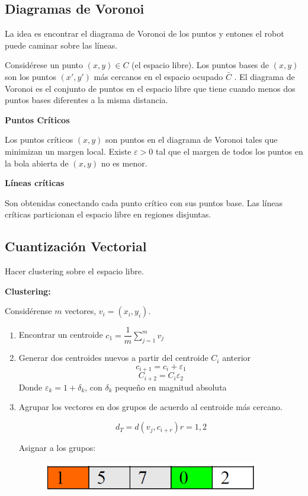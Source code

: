 \subsection{Diagramas de Voronoi}

La idea es encontrar el diagrama de Voronoi de los puntos y entones el robot puede caminar sobre las líneas.

Considérese un punto $(x,y) \in C$ (el espacio libre). Los puntos bases de $(x,y)$ son los puntos $(x',y')$ más
cercanos en el espacio ocupado $\bar{C}$ . El diagrama de Voronoi es el conjunto de puntos en el espacio libre que
tiene cuando menos dos puntos bases diferentes a la misma distancia.


\textbf{Puntos Críticos}

Los puntos críticos $(x,y)$ son puntos en el diagrama de Voronoi tales que minimizan un margen local.
Existe $\varepsilon > 0$  tal que el margen de todos los puntos en la bola abierta de $(x,y)$ no es menor.


\textbf{Líneas críticas}

Son obtenidas conectando cada punto crítico con sus puntos base. Las líneas críticas particionan el espacio
libre en regiones disjuntas.

\subsection{Cuantización Vectorial}

Hacer clustering sobre el espacio libre.

\textbf{Clustering:}

Considérense $m$ vectores, $v_i = (x_i , y_i).$

\begin{enumerate}[1.]
	\item Encontrar un centroide $c_1 = \dfrac{1}{m} \sum_{j=1}^{m} v_j$
	
	\item Generar dos centroides nuevos a partir del centroide $C_i$ anterior
	$$c_{i+1} = c_i + \varepsilon_1$$
	$$C_{i+2} = C_i \varepsilon_2$$
	Donde $\varepsilon_k = 1 + \delta_k$, con $\delta_k$ pequeño en magnitud absoluta
	\item Agrupar los vectores en dos grupos de acuerdo al centroide más cercano.
	
	$$d_T = d(v_j , c_{i+r})    r=1,2$$
	
	Asignar a los grupos:
	\begin{figure}[h!]
		\centering
		\includegraphics[width=0.9\textwidth]{images/img90.png}
		\label{figura90}
	\end{figure}
	
\end{enumerate}


